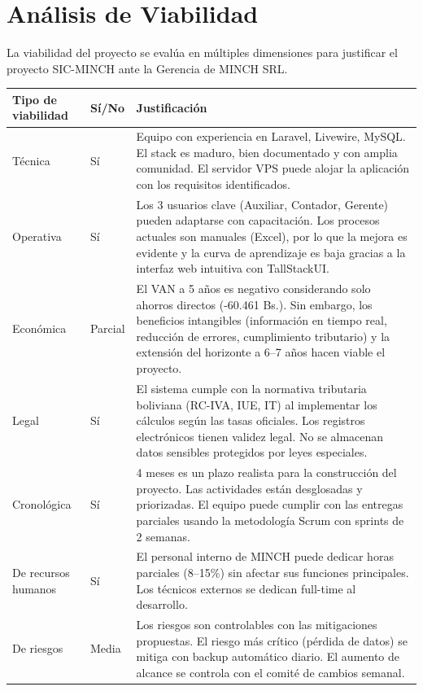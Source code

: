 \documentclass[stu]{apa7}
\begin{document}
\section{Análisis de Viabilidad}

La viabilidad del proyecto se evalúa en múltiples dimensiones para justificar el proyecto SIC-MINCH ante la Gerencia de MINCH SRL.

\begin{longtable}{|L{3cm}|C{1.5cm}|L{10cm}|}
\hline
{}
\textbf{Tipo de viabilidad} & \textbf{Sí/No} & \textbf{Justificación} \\
\hline
Técnica & Sí & Equipo con experiencia en Laravel, Livewire, MySQL. El stack es maduro, bien documentado y con amplia comunidad. El servidor VPS puede alojar la aplicación con los requisitos identificados. \\
\hline
Operativa & Sí & Los 3 usuarios clave (Auxiliar, Contador, Gerente) pueden adaptarse con capacitación. Los procesos actuales son manuales (Excel), por lo que la mejora es evidente y la curva de aprendizaje es baja gracias a la interfaz web intuitiva con TallStackUI. \\
\hline
Económica & Parcial & El VAN a 5 años es negativo considerando solo ahorros directos (-60.461 Bs.). Sin embargo, los beneficios intangibles (información en tiempo real, reducción de errores, cumplimiento tributario) y la extensión del horizonte a 6--7 años hacen viable el proyecto. \\
\hline
Legal & Sí & El sistema cumple con la normativa tributaria boliviana (RC-IVA, IUE, IT) al implementar los cálculos según las tasas oficiales. Los registros electrónicos tienen validez legal. No se almacenan datos sensibles protegidos por leyes especiales. \\
\hline
Cronológica & Sí & 4 meses es un plazo realista para la construcción del proyecto. Las actividades están desglosadas y priorizadas. El equipo puede cumplir con las entregas parciales usando la metodología Scrum con sprints de 2 semanas. \\
\hline
De recursos humanos & Sí & El personal interno de MINCH puede dedicar horas parciales (8--15\%) sin afectar sus funciones principales. Los técnicos externos se dedican full-time al desarrollo. \\
\hline
De riesgos & Media & Los riesgos son controlables con las mitigaciones propuestas. El riesgo más crítico (pérdida de datos) se mitiga con backup automático diario. El aumento de alcance se controla con el comité de cambios semanal. \\
\hline
\end{longtable}
\end{document}
